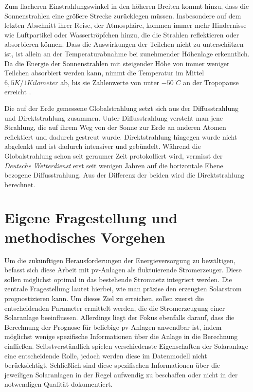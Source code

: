 \documentclass[12pt, a4paper]{article}
\begin{document}
Zum flacheren Einstrahlungswinkel in den höheren Breiten kommt hinzu, dass die Sonnenstrahlen eine größere Strecke zurücklegen müssen. Insbesondere auf dem letzten Abschnitt ihrer Reise, der Atmosphäre, kommen immer mehr Hindernisse wie Luftpartikel oder Wassertröpfchen hinzu, die die Strahlen reflektieren oder absorbieren können. Dass die Auswirkungen der Teilchen nicht zu unterschätzen ist, ist allein an der Temperaturabnahme bei zunehmender Höhenlage erkenntlich. Da die Energie der Sonnenstrahlen mit steigender Höhe von immer weniger Teilchen absorbiert werden kann, nimmt die Temperatur im Mittel $6,5 K/ 1 Kilometer$  ab, bis sie Zahlenwerte von unter $-50 ^\circ C$ an der Tropopause erreicht \cite{ws:dwd}.


Die auf der Erde gemessene Globalstrahlung setzt sich aus der Diffusstrahlung und Direktstrahlung zusammen. Unter Diffusstrahlung versteht man jene Strahlung, die auf ihrem Weg von der Sonne zur Erde an anderen Atomen reflektiert und dadurch gestreut wurde. Direktstrahlung hingegen wurde nicht abgelenkt und ist dadurch intensiver und gebündelt. Während die Globalstrahlung schon seit geraumer Zeit protokolliert wird,  vermisst der \textit{Deutsche Wetterdienst} erst seit wenigen Jahren auf die horizontale Ebene bezogene Diffusstrahlung. Aus der Differenz der beiden wird die Direktstrahlung berechnet. 

\newpage

\section{Eigene Fragestellung und methodisches Vorgehen}

Um die zukünftigen Herausforderungen der Energieversorgung zu bewältigen, befasst sich diese Arbeit mit \ac{pv}-Anlagen als fluktuierende Stromerzeuger. Diese sollen möglichst optimal in das bestehende Stromnetz integriert werden. Die zentrale Fragestellung lautet hierbei, wie man präzise den erzeugten Solarstrom prognostizieren kann. Um dieses Ziel zu erreichen, sollen zuerst die entscheidenden Parameter ermittelt werden, die die Stromerzeugung einer Solaranlage beeinflussen. Allerdings liegt der Fokus ebenfalls darauf, dass die Berechnung der Prognose für beliebige \ac{pv}-Anlagen anwendbar ist, indem möglichst wenige spezifische Informationen über die Anlage in die Berechnung einfließen. Selbstverständlich spielen verschiedenste Eigenschaften der Solaranlage eine entscheidende Rolle, jedoch werden diese im Datenmodell nicht berücksichtigt. Schließlich sind diese spezifischen Informationen über die jeweiligen Solaranlagen in der Regel aufwendig zu beschaffen oder nicht in der notwendigen Qualität dokumentiert.
\end{document}
